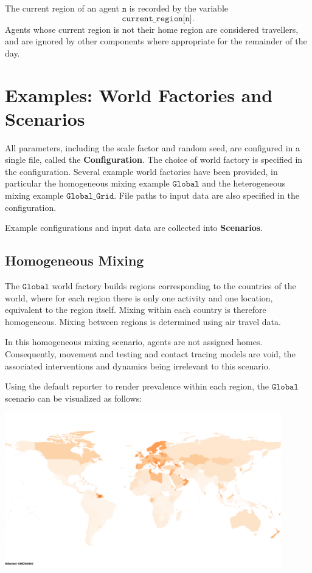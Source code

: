 \documentclass[10pt,letterpaper]{article}
\begin{document}
The current region of an agent $\texttt{n}$ is recorded by the variable $$\texttt{current{\_}region[n]}.$$ Agents whose current region is not their home region are considered travellers, and are ignored by other components where appropriate for the remainder of the day.

\section{Examples: World Factories and Scenarios}

All parameters, including the scale factor and random seed, are configured in a single file, called the \textbf{Configuration}. The choice of world factory is specified in the configuration. Several example world factories have been provided, in particular the homogeneous mixing example $\texttt{Global}$ and the heterogeneous mixing example $\texttt{Global{\_}Grid}$. File paths to input data are also specified in the configuration. 

Example configurations and input data are collected into \textbf{Scenarios}.

\subsection{Homogeneous Mixing}

The $\texttt{Global}$ world factory builds regions corresponding to the countries of the world, where for each region there is only one activity and one location, equivalent to the region itself. Mixing within each country is therefore homogeneous. Mixing between regions is determined using air travel data.

In this homogeneous mixing scenario, agents are not assigned homes. Consequently, movement and testing and contact tracing models are void, the associated interventions and dynamics being irrelevant to this scenario.

Using the default reporter to render prevalence within each region, the $\texttt{Global}$ scenario can be visualized as follows:

\begin{center}
\includegraphics[width=0.9\textwidth]{homogeneous}
\end{center}
\end{document}
